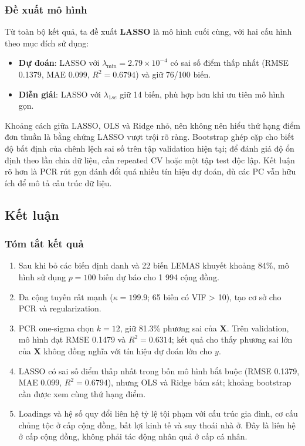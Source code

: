 \subsubsection{Đề xuất mô
hình}\label{ux111ux1ec1-xuux1ea5t-muxf4-huxecnh}

Từ toàn bộ kết quả, ta đề xuất \textbf{LASSO} là mô hình cuối cùng, với
hai cấu hình theo mục đích sử dụng:

\begin{itemize}
\tightlist
\item
  \textbf{Dự đoán}: LASSO với
  \(\lambda_{\min} = \ensuremath{2.79\times 10^{-4}}\) có sai số điểm
  thấp nhất (RMSE 0.1379, MAE 0.099, \(R^2=0.6794\)) và giữ 76/100 biến.
\item
  \textbf{Diễn giải}: LASSO với \(\lambda_{1se}\) giữ 14 biến, phù hợp
  hơn khi ưu tiên mô hình gọn.
\end{itemize}

Khoảng cách giữa LASSO, OLS và Ridge nhỏ, nên không nên hiểu thứ hạng
điểm đơn thuần là bằng chứng LASSO vượt trội rõ ràng. Bootstrap ghép cặp
cho biết độ bất định của chênh lệch sai số trên tập validation hiện tại;
để đánh giá độ ổn định theo lần chia dữ liệu, cần repeated CV hoặc một
tập test độc lập. Kết luận rõ hơn là PCR rút gọn đánh đổi quá nhiều tín
hiệu dự đoán, dù các PC vẫn hữu ích để mô tả cấu trúc dữ liệu.

\subsection{Kết luận}\label{kux1ebft-luux1eadn}

\subsubsection{Tóm tắt kết quả}\label{tuxf3m-tux1eaft-kux1ebft-quux1ea3}

\begin{enumerate}
\def\labelenumi{\arabic{enumi}.}
\tightlist
\item
  Sau khi bỏ các biến định danh và 22 biến LEMAS khuyết khoảng 84\%, mô
  hình sử dụng \(p=100\) biến dự báo cho 1 994 cộng đồng.
\item
  Đa cộng tuyến rất mạnh (\(\kappa=199.9\); 65 biến có VIF
  \textgreater{} 10), tạo cơ sở cho PCR và regularization.
\item
  PCR one-sigma chọn \(k=12\), giữ 81.3\% phương sai của \(\mathbf X\).
  Trên validation, mô hình đạt RMSE 0.1479 và \(R^2=0.6314\); kết quả
  cho thấy phương sai lớn của \(\mathbf X\) không đồng nghĩa với tín
  hiệu dự đoán lớn cho \(y\).
\item
  LASSO có sai số điểm thấp nhất trong bốn mô hình bắt buộc (RMSE
  0.1379, MAE 0.099, \(R^2=0.6794\)), nhưng OLS và Ridge bám sát; khoảng
  bootstrap cần được xem cùng thứ hạng điểm.
\item
  Loadings và hệ số quy đổi liên hệ tỷ lệ tội phạm với cấu trúc gia
  đình, cơ cấu chủng tộc ở cấp cộng đồng, bất lợi kinh tế và suy thoái
  nhà ở. Đây là liên hệ ở cấp cộng đồng, không phải tác động nhân quả ở
  cấp cá nhân.
\end{enumerate}

